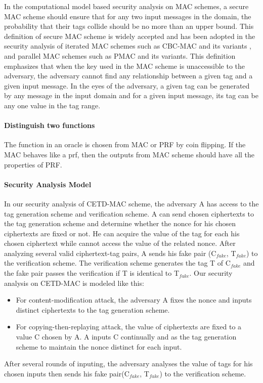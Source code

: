 \documentclass{article}
\begin{document}
In the computational model based security analysis on MAC schemes, a secure MAC scheme should ensure that for any two input messages in the domain, the probability that their tags collide should be no more than an upper bound. This definition of secure MAC scheme is widely accepted and has been adopted in the security analysis of iterated MAC schemes such as CBC-MAC \cite{} and its variants \cite{}, and parallel MAC schemes such as PMAC \cite{} and its variants\cite{}. This definition emphasizes that when the key used in the MAC scheme is unaccessible to the adversary, the adversary cannot find any relationship between a given tag and a given input message. In the eyes of the adversary, a given tag can be generated by any message in the input domain and for a given input message, its tag can be any one value in the tag range. 

\paragraph{Distinguish two functions}
The function in an oracle is chosen from MAC or PRF by coin flipping. If the MAC behaves like a prf, then the outputs from MAC scheme should have all the properties of PRF.
\paragraph{Security Analysis Model}%
In our security analysis of CETD-MAC scheme, the adversary A has access to the tag generation scheme and verification scheme. A can send chosen ciphertexts to the tag generation scheme and determine whether the nonce for his chosen ciphertexts are fixed or not. He can acquire the value of the tag for each his chosen ciphertext while cannot access the value of the related nonce. After analyzing several valid ciphertext-tag pairs, A sends his fake pair (C$_{fake}$, T$_{fake}$) to the verification scheme. The verification scheme generates the tag T of C$_{fake}$ and the fake pair passes the verification if T is identical to T$_{fake}$. Our security analysis on CETD-MAC is modeled like this:
\begin{itemize}
	\item For content-modification attack, the adversary A fixes the nonce and inputs distinct ciphertexts to the tag generation scheme. 	
	\item For copying-then-replaying attack, the value of ciphertexts are fixed to a value C chosen by A. A inputs C continually and as the tag generation scheme to maintain the nonce distinct for each input.    
\end{itemize}
After several rounds of inputing, the adversary analyses the value of tags for his chosen inputs then sends his fake pair(C$_{fake}$, T$_{fake}$) to the verification scheme.   	
\end{document}
